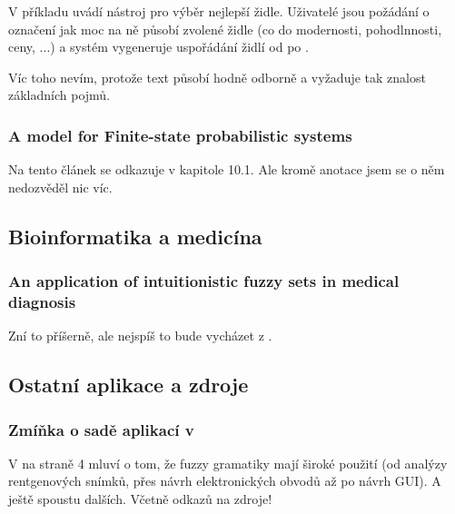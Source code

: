 \documentclass[a4paper,10pt]{article}
\begin{document}
V příkladu uvádí nástroj pro výběr nejlepší židle. Uživatelé jsou požádání o označení jak moc na ně působí zvolené židle (co do modernosti, pohodlnnosti, ceny, ...) a systém vygeneruje uspořádání židlí od  po .

Víc toho nevím, protože text působí hodně odborně a vyžaduje tak znalost základních pojmů.


\subsubsection*{A model for Finite-state probabilistic systems \cite{BruFu-ModelFinStateProbSyss}}

Na tento článek se odkazuje \cite{MorMal-FuzzAutAndLangs} v kapitole 10.1. Ale kromě anotace jsem se o něm nedozvěděl nic víc.




\subsection{Bioinformatika a medicína}




\subsubsection*{An application of intuitionistic fuzzy sets in medical diagnosis \cite{SupBisAkh-AppIntFuzzSetMedDiag}}

Zní to příšerně, ale nejspíš to bude vycházet z \cite{GupSar-FuzzAutDecProc}.


\subsection{Ostatní aplikace a zdroje}

\subsubsection*{Zmíňka o sadě aplikací v \cite{OmlThoGil-FuzzFinStaAutCanDetEncIntRecNeuNet}}
V \cite{OmlThoGil-FuzzFinStaAutCanDetEncIntRecNeuNet} na straně 4 mluví o tom, že fuzzy gramatiky mají široké použití (od analýzy rentgenových snímků, přes návrh elektronických obvodů až po návrh GUI). A ještě spoustu dalších. Včetně odkazů na zdroje!
\end{document}
